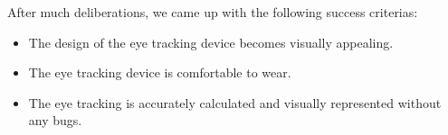 After much deliberations, we came up with the following success criterias:
\begin {itemize}
	\item The design of the eye tracking device becomes visually appealing.
	\item The eye tracking device is comfortable to wear.
	\item The eye tracking is accurately calculated and visually represented without any bugs.
\end {itemize}